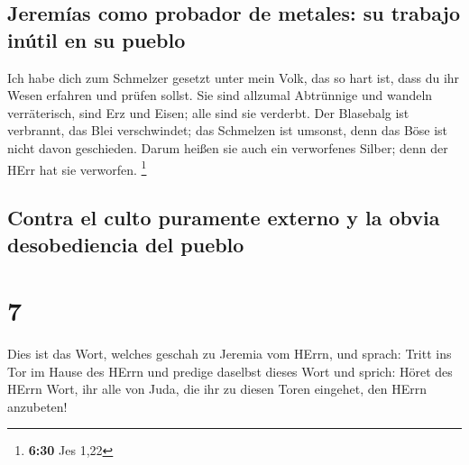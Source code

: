 \hypertarget{jeremuxedas-como-probador-de-metales-su-trabajo-inuxfatil-en-su-pueblo}{%
\subsection{Jeremías como probador de metales: su trabajo inútil en su
pueblo}\label{jeremuxedas-como-probador-de-metales-su-trabajo-inuxfatil-en-su-pueblo}}

 Ich habe dich zum Schmelzer gesetzt unter mein Volk, das
so hart ist, dass du ihr Wesen erfahren und prüfen sollst.
 Sie sind allzumal Abtrünnige und wandeln verräterisch,
sind Erz und Eisen; alle sind sie verderbt.  Der
Blasebalg ist verbrannt, das Blei verschwindet; das Schmelzen ist
umsonst, denn das Böse ist nicht davon geschieden.  Darum
heißen sie auch ein verworfenes Silber; denn der HErr hat sie verworfen.
\footnote{\textbf{6:30} Jes 1,22}

\hypertarget{contra-el-culto-puramente-externo-y-la-obvia-desobediencia-del-pueblo}{%
\subsection{Contra el culto puramente externo y la obvia desobediencia
del
pueblo}\label{contra-el-culto-puramente-externo-y-la-obvia-desobediencia-del-pueblo}}

\hypertarget{section-6}{%
\section{7}\label{section-6}}

 Dies ist das Wort, welches geschah zu Jeremia vom HErrn,
und sprach:  Tritt ins Tor im Hause des HErrn und predige
daselbst dieses Wort und sprich: Höret des HErrn Wort, ihr alle von
Juda, die ihr zu diesen Toren eingehet, den HErrn anzubeten!

